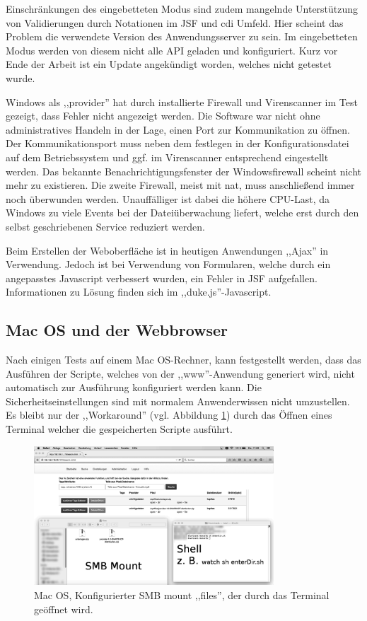 \documentclass[oneside, ngerman, toc=bibliography,bibliography=totoc,listof=entryprefix, open=right,numbers=noenddot,fontsize=12pt]{scrbook}
\begin{document}
Einschränkungen des eingebetteten Modus sind zudem mangelnde Unterstützung von Validierungen durch Notationen im JSF und \acrshort{cdi} Umfeld.
Hier scheint das Problem die verwendete Version des Anwendungsserver zu sein. Im eingebetteten Modus werden von diesem nicht alle API geladen und konfiguriert. Kurz vor Ende der Arbeit ist ein Update angekündigt worden, welches nicht getestet wurde.


Windows als ,,provider'' hat durch installierte Firewall und Virenscanner im Test gezeigt, dass Fehler nicht angezeigt werden. Die Software war nicht ohne administratives Handeln in der Lage, einen Port zur Kommunikation zu öffnen. Der Kommunikationsport muss neben dem festlegen in der Konfigurationsdatei auf dem Betriebssystem und ggf. im Virenscanner entsprechend eingestellt werden. Das bekannte Benachrichtigungsfenster der Windowsfirewall scheint nicht mehr zu existieren. Die zweite Firewall, meist mit  \acrshort{nat}, muss anschließend immer noch überwunden werden. Unauffälliger ist dabei die höhere CPU-Last, da Windows zu viele Events bei der Dateiüberwachung liefert, welche erst durch den selbst geschriebenen Service reduziert werden.

Beim Erstellen der Weboberfläche ist in heutigen Anwendungen ,,Ajax'' in Verwendung. Jedoch ist bei Verwendung von Formularen, welche durch ein angepasstes Javascript verbessert wurden, ein Fehler in JSF aufgefallen. Informationen zu Lösung finden sich im ,,duke.js''-Javascript. 


\subsection{Mac OS und der Webbrowser}
Nach einigen Tests auf einem Mac OS-Rechner, kann festgestellt werden, dass das Ausführen der Scripte, welches von der ,,www''-Anwendung generiert wird, nicht automatisch zur Ausführung konfiguriert werden kann. Die Sicherheitseinstellungen sind mit normalem Anwenderwissen nicht umzustellen.
Es bleibt nur der ,,Workaround'' (vgl. Abbildung \ref{fig:apple}) durch das Öffnen eines Terminal welcher die gespeicherten Scripte ausführt.
\begin{figure}[htbp] 
    \centering
    \includegraphics[width=0.8\textwidth]{Masterarbeit_Bilder/appel_terminal.png}
    \caption{Mac OS, Konfigurierter SMB mount ,,files'', der durch das Terminal geöffnet wird. }
    \label{fig:apple}
\end{figure}  
\end{document}
